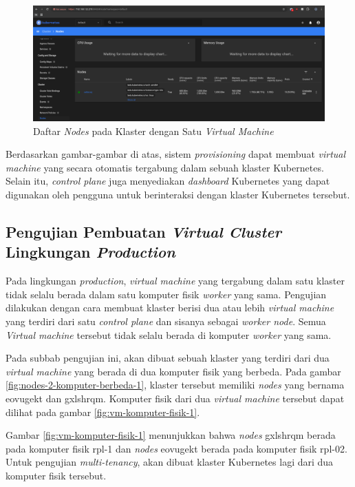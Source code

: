 \begin{figure}[H]
  \centering
  \includegraphics[scale=0.3]{gambar/kubernetes-dashboard-access-local-with-nodes.png}
  \caption{Daftar \emph{Nodes} pada Klaster dengan Satu \emph{Virtual Machine}}
  \label{fig:daftar-nodes-pada-dashboard-kubernetes}
\end{figure}

Berdasarkan gambar-gambar di atas, sistem \emph{provisioning} dapat membuat
\emph{virtual machine} yang secara otomatis tergabung dalam sebuah klaster Kubernetes.
Selain itu, \emph{control plane} juga menyediakan \emph{dashboard} Kubernetes yang dapat
digunakan oleh pengguna untuk berinteraksi dengan klaster Kubernetes tersebut.

\subsection{Pengujian Pembuatan \emph{Virtual Cluster} Lingkungan \emph{Production}}
\label{subsec:pengujian-pembuatan-vc-prod}

Pada lingkungan \emph{production}, \emph{virtual machine} yang tergabung dalam
satu klaster tidak selalu berada dalam satu komputer fisik \emph{worker} yang sama.
Pengujian dilakukan dengan cara membuat klaster berisi dua atau lebih \emph{virtual machine}
yang terdiri dari satu \emph{control plane} dan sisanya sebagai \emph{worker node}.
Semua \emph{Virtual machine} tersebut tidak selalu berada di komputer \emph{worker}
yang sama.

Pada subbab pengujian ini, akan dibuat sebuah klaster yang terdiri dari dua
\emph{virtual machine} yang berada di dua komputer fisik yang berbeda. Pada gambar
\ref{fig:nodes-2-komputer-berbeda-1}, klaster tersebut memiliki \emph{nodes} yang
bernama eovugekt dan gxlshrqm. Komputer fisik dari dua \emph{virtual machine}
tersebut dapat dilihat pada gambar \ref{fig:vm-komputer-fisik-1}.

Gambar \ref{fig:vm-komputer-fisik-1} menunjukkan bahwa \emph{nodes} gxlshrqm berada
pada komputer fisik rpl-1 dan \emph{nodes} eovugekt berada pada
komputer fisik rpl-02. Untuk pengujian \emph{multi-tenancy}, akan
dibuat klaster Kubernetes lagi dari dua komputer fisik tersebut.

